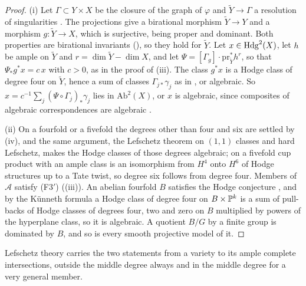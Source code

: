 \begin{proof}
(i) Let $\Gamma\subset Y\times X$ be the closure of the graph of $\varphi$
and $\widetilde Y\to\Gamma$ a resolution of singularities \cite{Hir64}. The
projections give a birational morphism $\widetilde Y\to Y$ and a morphism
$g\colon\widetilde Y\to X$, which is surjective, being proper and dominant.
Both properties are birational invariants (),
so they hold for $\widetilde Y$. Let $x\in\mathrm{Hdg}^{2}(X)$, let $h$ be ample on
$\widetilde Y$ and $r=\dim\widetilde Y-\dim X$, and let
$\Psi=[\Gamma_{g}]\cdot\mathrm{pr}_{\widetilde Y}^{*}h^{r}$, so that
$\Psi_{*}g^{*}x=c\,x$ with $c>0$, as in the proof of
(iii). The class $g^{*}x$ is a Hodge class of degree four
on $\widetilde Y$, hence a sum of classes $\Gamma_{j*}\gamma_{j}$ as in
, or algebraic. So $x=c^{-1}\sum_{j}(\Psi\circ
\Gamma_{j})_{*}\gamma_{j}$ lies in $\mathrm{Ab}^{2}(X)$, or $x$ is
algebraic, since composites of algebraic correspondences are algebraic
\cite[Chapter~16]{Ful98}.

(ii) On a fourfold or a fivefold the degrees other than four and six are
settled by (iv), and the same argument, the Lefschetz
theorem on $(1,1)$ classes and hard Lefschetz, makes the Hodge classes of
those degrees algebraic; on a fivefold cup product with an ample class is an
isomorphism from $H^{4}$ onto $H^{6}$ of Hodge structures up to a Tate twist,
so degree six follows from degree four. Members of $\mathcal{A}$ satisfy
\textup{(F3$'$)} ((iii)). An abelian fourfold $B$
satisfies the Hodge conjecture \cite{Mar25a,Mar25b}, and by the K\"unneth
formula a Hodge class of degree four on $B\times\mathbb{P}^{k}$ is a sum of
pull-backs of Hodge classes of degrees four, two and zero on $B$ multiplied
by powers of the hyperplane class, so it is algebraic. A quotient $B/G$ by a
finite group is dominated by $B$, and so is every smooth projective model of
it.
\end{proof}

Lefschetz theory carries the two statements from a variety to its ample
complete intersections, outside the middle degree always and in the middle
degree for a very general member.

